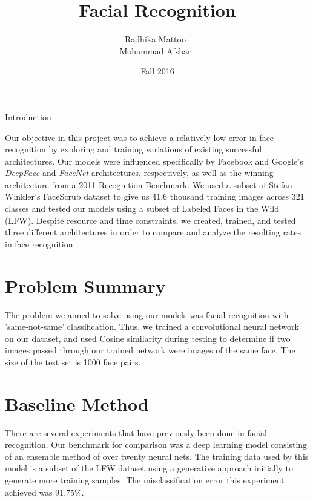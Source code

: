 \documentclass[11pt]{article}
\title{Facial Recognition}
\date{Fall 2016}
\author{
  Radhika Mattoo\
  \email{(rm3485@nyu.edu)}
  \\
  Mohammad Afshar\
  \email{(ma2510@nyu.edu)}
  \\
}
\begin{document}
\maketitle
\newcommand{\slugmaster}


\section{Introduction}
\par
Our objective in this project was to achieve a relatively low error in face recognition by exploring and training variations of existing successful architectures. Our models were influenced specifically by Facebook and Google's \textit{DeepFace} and \textit{FaceNet} architectures, respectively, as well as the winning architecture from a 2011 Recognition Benchmark. We used a subset of Stefan Winkler's FaceScrub dataset to give us 41.6 thousand training images across 321 classes and tested our models using a subset of Labeled Faces in the Wild (LFW). Despite resource and time constraints, we created, trained, and tested three different architectures in order to compare and analyze the resulting rates in face recognition.
\section{Problem Summary}
    \par
    The problem we aimed to solve using our models was facial recognition with 'same-not-same' classification. Thus, we trained a convolutional neural network on our dataset, and used Cosine similarity during testing to determine if two images passed through our trained network were images of the same face. The size of the test set is 1000 face pairs.
\section{Baseline Method}
\par
There are several experiments that have previously been done in facial recognition. Our benchmark for comparison was a deep learning model consisting of an ensemble method of over twenty neural nets. The training data used by this model is a subset of the LFW dataset using a generative approach initially to generate more training samples. The misclassification error this experiment achieved was 91.75\%. 
\end{document}
